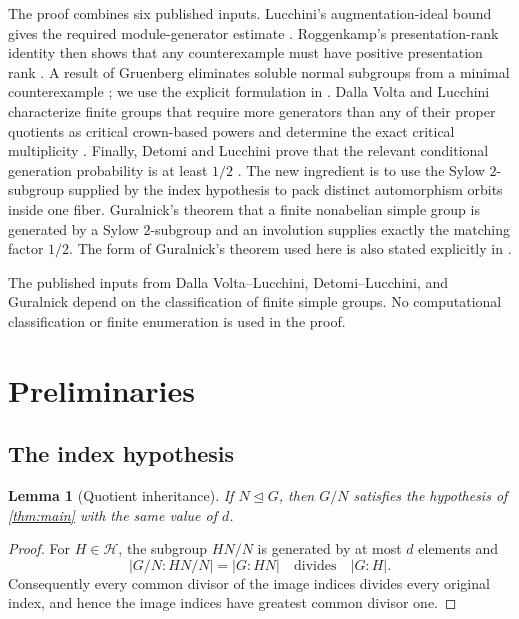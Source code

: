 \documentclass[11pt,reqno]{amsart}
\newtheorem{lemma}[theorem]{Lemma}
\theoremstyle{remark}
\begin{document}
The proof combines six published inputs.  Lucchini's augmentation-ideal
bound gives the required module-generator estimate
\cite[Theorem~2 and Proposition~2]{Lucchini1992}.  Roggenkamp's
presentation-rank identity then shows that any counterexample must have
positive presentation rank \cite[Theorem~2.1]{Roggenkamp1979}.  A result of
Gruenberg eliminates soluble normal subgroups from a minimal counterexample
\cite[p.~218]{Gruenberg1976}; we use the explicit formulation in
\cite[2.1, p.~209]{Lucchini1990}.  Dalla Volta and Lucchini characterize
finite groups that require more generators than any of their proper
quotients as critical crown-based powers and determine the exact critical
multiplicity
\cite[Theorems~1.4 and 2.7]{DallaVoltaLucchini1998}.  Finally, Detomi and
Lucchini prove that the relevant conditional generation probability is at
least $1/2$ \cite{DetomiLucchini2013}.  The new ingredient is to use the
Sylow $2$-subgroup supplied by the index hypothesis to pack distinct
automorphism orbits inside one fiber.  Guralnick's theorem that a finite
nonabelian simple group is generated by a Sylow $2$-subgroup and an
involution \cite{Guralnick1986} supplies exactly the matching factor $1/2$.
The form of Guralnick's theorem used here is also stated explicitly in
\cite[Introduction]{BurnessGuralnick2024}.

The published inputs from Dalla Volta--Lucchini, Detomi--Lucchini, and
Guralnick depend on the classification of finite simple groups.  No
computational classification or finite enumeration is used in the proof.

\section{Preliminaries}

\subsection{The index hypothesis}

\begin{lemma}[Quotient inheritance]\label{lem:quotient}
If $N\unlhd G$, then $G/N$ satisfies the hypothesis of
\cref{thm:main} with the same value of $d$.
\end{lemma}

\begin{proof}
For $H\in\mathcal H$, the subgroup $HN/N$ is generated by at most $d$
elements and
\[
 \lvert G/N:HN/N\rvert=\lvert G:HN\rvert
 \quad\text{divides}\quad \lvert G:H\rvert.
\]
Consequently every common divisor of the image indices divides every
original index, and hence the image indices have greatest common divisor
one.
\end{proof}
\end{document}
